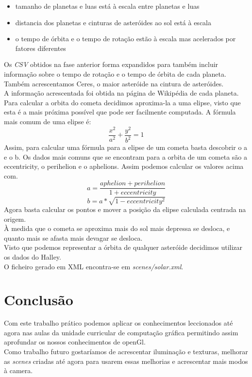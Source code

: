 \documentclass[a4paper]{report}
\begin{document}
\begin{itemize}
        \item tamanho de planetas e luas está à escala entre planetas e luas
        \item distancia dos planetas e cinturas de asteróides ao sol está à
            escala
        \item o tempo de órbita e o tempo de rotação estão à escala mas
            acelerados por fatores diferentes
\end{itemize}
Os \textit{CSV} obtidos na fase anterior forma expandidos para também incluir
informação sobre o tempo de rotação e o tempo de órbita de cada planeta. Também
acrescentamos Ceres, o maior asteróide na cintura de asteróides.\\
A informação acrescentada foi obtida na página de Wikipédia de cada planeta.\\
Para calcular a orbita do cometa decidimos aproxima-la a uma elipse, visto que
esta é a mais próxima possível que pode ser facilmente computada. A fórmula mais
comum de uma elipse é:
\[ \frac{x^2}{a^2} + \frac{y^2}{b^2} = 1 \]
Assim, para calcular uma fórmula para a elipse de um cometa basta descobrir o a
e o b. Os dados mais comuns que se encontram para a orbita de um cometa são a
eccentricity, o perihelion e o aphelions. Assim podemos calcular os valores
acima com.
\[ a = \frac{aphelion + perihelion}{1 + eccentricity} \]
\[ b = a * \sqrt{1 - eccentricity^2} \]
Agora basta calcular os pontos e mover a posição da elipse calculada centrada na
origem.\\
À medida que o cometa se aproxima mais do sol mais depressa se desloca, e quanto
mais se afasta mais devagar se desloca.\\
Visto que podemos representar a órbita de qualquer asteróide decidimos utilizar
os dados do Halley.\\
O ficheiro gerado em XML encontra-se em \textit{scenes/solar.xml}.


\chapter{Conclusão}
Com este trabalho prático podemos aplicar os conhecimentos leccionados até agora
nas aulas da unidade curricular de computação gráfica permitindo assim
aprofundar os nossos conhecimentos de openGl.\\
Como trabalho futuro gostaríamos de acrescentar iluminação e texturas, melhorar
as \textit{scenes} criadas até agora para usarem essas melhorias e acrescentar
mais modos à camera.
\end{document}
